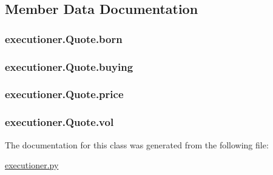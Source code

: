 \subsection{Member Data Documentation}
\hypertarget{classexecutioner_1_1_quote_ae7cb10d664fb10d78bf5090365141880}{
\subsubsection[{born}]{\setlength{\rightskip}{0pt plus 5cm}executioner.\-Quote.\-born}}\label{classexecutioner_1_1_quote_ae7cb10d664fb10d78bf5090365141880}
\hypertarget{classexecutioner_1_1_quote_a3c70c5196ea5d387a1e9433019abdb95}{
\subsubsection[{buying}]{\setlength{\rightskip}{0pt plus 5cm}executioner.\-Quote.\-buying}}\label{classexecutioner_1_1_quote_a3c70c5196ea5d387a1e9433019abdb95}
\hypertarget{classexecutioner_1_1_quote_ac72ccb110faea8cc62eec1c1c7f72b7b}{
\subsubsection[{price}]{\setlength{\rightskip}{0pt plus 5cm}executioner.\-Quote.\-price}}\label{classexecutioner_1_1_quote_ac72ccb110faea8cc62eec1c1c7f72b7b}
\hypertarget{classexecutioner_1_1_quote_ace7df6d08729cfc59d6373b36e56b81d}{
\subsubsection[{vol}]{\setlength{\rightskip}{0pt plus 5cm}executioner.\-Quote.\-vol}}\label{classexecutioner_1_1_quote_ace7df6d08729cfc59d6373b36e56b81d}


The documentation for this class was generated from the following file\-:\begin{DoxyCompactItemize}
\item 
\hyperlink{executioner_8py}{executioner.\-py}\end{DoxyCompactItemize}
